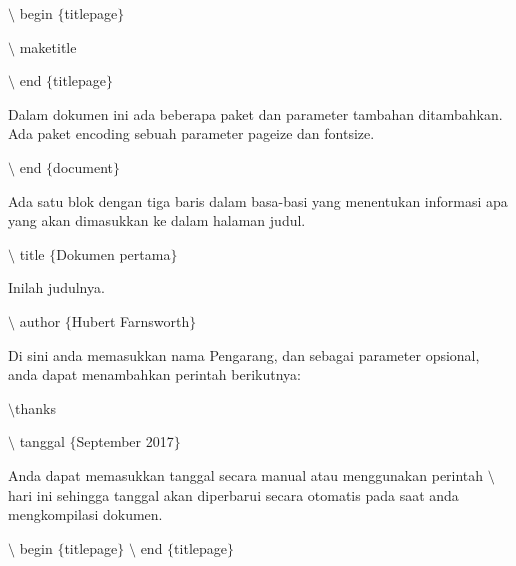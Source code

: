 \begin{itemize}
\hspace*{0.5in}$\setminus$ begin $ \{ $titlepage$ \} $\par

\hspace*{0.5in}$\setminus$ maketitle\par

\hspace*{0.5in}$\setminus$ end $ \{ $titlepage$ \} $\par
\vspace{\baselineskip}
Dalam dokumen ini ada beberapa paket dan parameter tambahan ditambahkan. Ada paket encoding sebuah parameter pageize dan fontsize.\par

\hspace*{0.5in}$\setminus$ end $ \{ $document$ \} $\par

Ada satu blok dengan tiga baris dalam basa-basi yang menentukan informasi apa yang akan dimasukkan ke dalam halaman judul.\par

\hspace*{0.5in}$\setminus$ title $ \{ $Dokumen pertama$ \} $\par

\hspace*{0.5in}Inilah judulnya.\par

\hspace*{0.5in}$\setminus$ author $ \{ $Hubert Farnsworth$ \} $\par

Di sini anda memasukkan nama Pengarang, dan sebagai parameter opsional, anda dapat menambahkan perintah berikutnya:\par
\vspace{\baselineskip}
\hspace*{0.5in}$\setminus$thanks\par

\hspace*{0.5in}$\setminus$ tanggal $ \{ $September 2017$ \} $\par

Anda dapat memasukkan tanggal secara manual atau menggunakan perintah $\setminus$ hari ini sehingga tanggal akan diperbarui secara otomatis pada saat anda mengkompilasi dokumen. \par
\vspace{\baselineskip}
\hspace*{0.5in}$\setminus$ begin $ \{ $titlepage$ \} $ $\setminus$ end $ \{ $titlepage$ \} $\par


\end{itemize}
